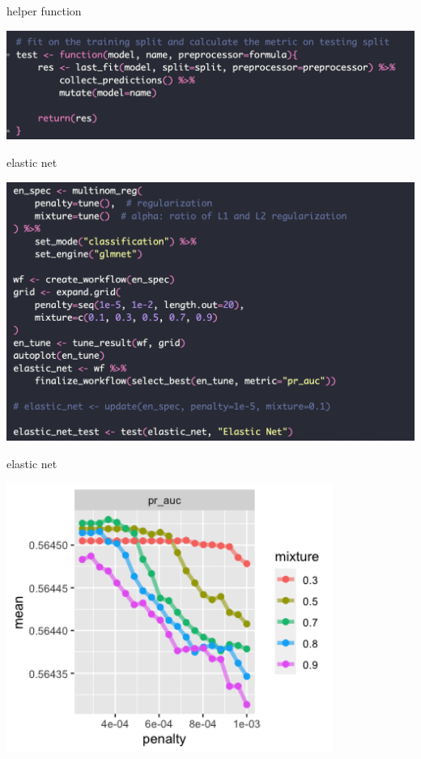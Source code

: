 \documentclass[
  ignorenonframetext,
]{beamer}
\begin{document}
\begin{frame}{helper function}
  \begin{center}
    \includegraphics{figure/pdf/code4.png}
  \end{center}
\end{frame}


\begin{frame}{elastic net}
  \begin{center}
    \includegraphics{figure/pdf/en.png}
  \end{center}
\end{frame}


\begin{frame}{elastic net}
  \begin{center}
    \includegraphics[width=0.8\textwidth]{figure/pdf/en_tune.png}
  \end{center}
\end{frame}
\end{document}
